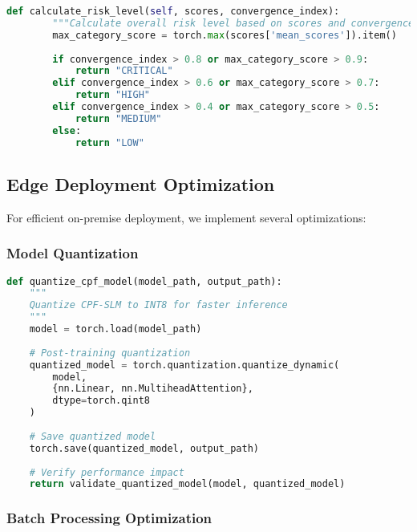 \documentclass[11pt,a4paper]{article}
\begin{document}
\begin{lstlisting}[language=Python, caption=Real-Time Inference System]
    def calculate_risk_level(self, scores, convergence_index):
        """Calculate overall risk level based on scores and convergence"""
        max_category_score = torch.max(scores['mean_scores']).item()
        
        if convergence_index > 0.8 or max_category_score > 0.9:
            return "CRITICAL"
        elif convergence_index > 0.6 or max_category_score > 0.7:
            return "HIGH"
        elif convergence_index > 0.4 or max_category_score > 0.5:
            return "MEDIUM"
        else:
            return "LOW"
\end{lstlisting}

\subsection{Edge Deployment Optimization}

For efficient on-premise deployment, we implement several optimizations:

\subsubsection{Model Quantization}

\begin{lstlisting}[language=Python, caption=Model Quantization]
def quantize_cpf_model(model_path, output_path):
    """
    Quantize CPF-SLM to INT8 for faster inference
    """
    model = torch.load(model_path)
    
    # Post-training quantization
    quantized_model = torch.quantization.quantize_dynamic(
        model,
        {nn.Linear, nn.MultiheadAttention},
        dtype=torch.qint8
    )
    
    # Save quantized model
    torch.save(quantized_model, output_path)
    
    # Verify performance impact
    return validate_quantized_model(model, quantized_model)
\end{lstlisting}

\subsubsection{Batch Processing Optimization}
\end{document}
